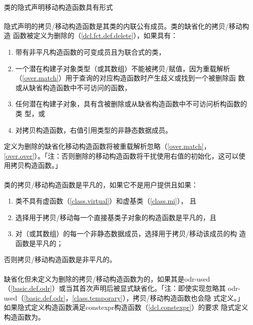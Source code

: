 \paragraph{}
类的隐式声明移动构造函数具有形式                                        \\
\mbox{}

\paragraph{}
隐式声明的拷贝/移动构造函数是其类的内联公有成员。类的缺省化的拷贝/移动构造
函数被定义为删除的（\ref{dcl.fct.def.delete}），如果具有：
\begin{enumerate}
  \item{带有非平凡构造函数的可变成员且为联合式的类，}
  \item{一个潜在构建子对象类型（或其数组）不能被拷贝/赋值，因为重载解析
    （\ref{over.match}）用于查询的对应构造函数时产生歧义或找到一个被删除函
    数或从缺省构造函数中不可访问的函数，}
  \item{任何潜在构建子对象，具有含被删除或从缺省构造函数中不可访问析构函数的类
    型，或}
  \item{对拷贝构造函数，右值引用类型的非静态数据成员。}
\end{enumerate}
定义为删除的缺省化移动构造函数将被重载解析忽略（\ref{over.match}，
\ref{over.over}）。「注：否则删除的移动构造函数将干扰使用右值的初始化，这可以使
用拷贝构造函数。」

\paragraph{}
类的拷贝/移动构造函数是平凡的，如果它不是用户提供且如果：
\begin{enumerate}
  \item{类不具有虚函数（\ref{class.virtual}）和虚基类（\ref{class.mi}），
    且}
  \item{选择用于拷贝/移动每一个直接基类子对象的构造函数是平凡的，且}
  \item{对（或其数组）的每一个非静态数据成员，选择用于拷贝/移动该成员的构
    造函数是平凡的；}
\end{enumerate}
否则拷贝/移动构造函数是非平凡的。

\paragraph{}
缺省化但未定义为删除的拷贝/移动构造函数为的，如果其是odr-used
（\ref{basic.def.odr}）或当其首次声明后被显式缺省化。「注：即使实现忽略其
odr-used（\ref{basic.def.odr}，\ref{class.temporary}），拷贝/移动构造函数也会隐
式定义。」如果隐式定义构造函数满足constexpr构造函数（\ref{dcl.constexpr}）的要求
隐式定义构造函数为。

